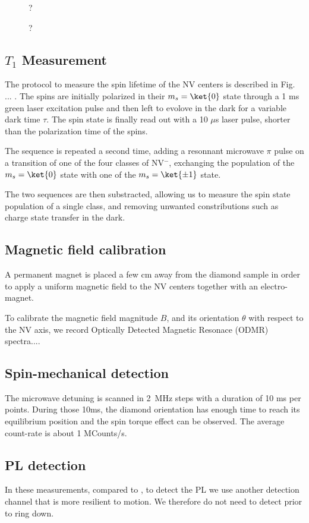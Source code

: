 \documentclass[preprintnumbers,amsmath,amssymb,onecolumn,12pt]{revtex4}
\begin{document}
\begin{figure}[!ht]
  \centering {}
  \caption{?}
	\label{Optics}
\end{figure}

\begin{figure}[!ht]
  \centering {}
  \caption{?}
	\label{Optics}
\end{figure}

\subsection{$T_1$ Measurement}
The protocol to measure the spin lifetime of the NV centers is described in Fig. ... . The spins are initially polarized in their $m_s=\ket{0}$ state through a 1 ms green laser excitation pulse and then left to evolove in the dark for a variable dark time $\tau$. The spin state is finally read out with a 10 $\mu$s laser pulse, shorter than the polarization time of the spins.

The sequence is repeated a second time, adding a resonnant microwave $\pi$ pulse on a transition of one of the four classes of NV$^-$, exchanging the population of the $m_s=\ket{0}$ state with one of the $m_s=\ket{\pm 1}$ state.

The two sequences are then substracted, allowing us to measure the spin state population of a single class, and removing unwanted constributions such as charge state transfer in the dark.

\subsection{Magnetic field calibration}

A permanent magnet is placed a few cm away from the diamond sample in order to apply a uniform magnetic field to the NV centers together with an electro-magnet.

To calibrate the magnetic field magnitude $B$, and its orientation $\theta$ with respect to the NV axis, we record Optically Detected Magnetic Resonace (ODMR) spectra.... 



\subsection{Spin-mechanical detection}

The microwave detuning is scanned in 2~MHz steps with a duration of 10 ms per points. During those 10ms, the diamond orientation has enough time to reach its equilibrium position and the spin torque effect can be observed. The average count-rate is about 1 MCounts/s.

\subsection{PL detection}

In these measurements, compared to \cite{DelordNat}, to detect the PL we use another detection channel that is more resilient to motion. We therefore do not need to detect prior to ring down.



\end{document}
